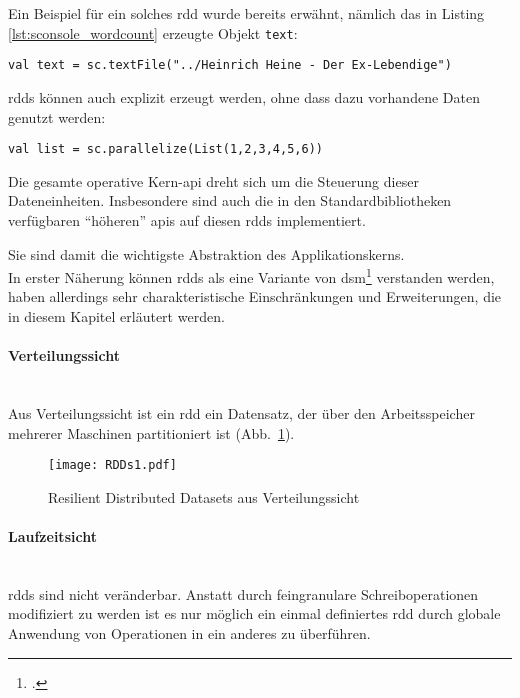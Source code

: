 Ein Beispiel für ein solches \gls{rdd} wurde bereits erwähnt, nämlich das in Listing \ref{lst:sconsole_wordcount} erzeugte Objekt \lstinline|text|:\\

\begin{lstlisting}
val text = sc.textFile("../Heinrich Heine - Der Ex-Lebendige")
\end{lstlisting}

\Glspl{rdd} können auch explizit erzeugt werden, ohne dass dazu vorhandene Daten genutzt werden:\\

\begin{lstlisting}
val list = sc.parallelize(List(1,2,3,4,5,6))
\end{lstlisting}

Die gesamte operative Kern-\gls{api} dreht sich um die Steuerung dieser Dateneinheiten. Insbesondere sind auch die in den Standardbibliotheken verfügbaren "`höheren"' \glspl{api} auf diesen \glspl{rdd} implementiert.

Sie sind damit die wichtigste Abstraktion des Applikationskerns.\\

In erster Näherung können \glspl{rdd} als eine Variante von \gls{dsm}\footcite{Nitzberg:1991:DSM:112827.112855} \cite{Mat12} verstanden werden, haben allerdings sehr charakteristische Einschränkungen und Erweiterungen, die in diesem Kapitel erläutert werden.\\

\paragraph{Verteilungssicht}\\

Aus Verteilungssicht ist ein \gls{rdd} ein Datensatz, der über den Arbeitsspeicher mehrerer Maschinen partitioniert ist (Abb.~\ref{fig:rdds1}).

\begin{figure}[ht!]
	\centering
  \texttt{[image: RDDs1.pdf]}
	\caption{Resilient Distributed Datasets aus Verteilungssicht}
	\label{fig:rdds1}
\end{figure}

\paragraph{Laufzeitsicht}\\

\Glspl{rdd} sind nicht veränderbar. Anstatt durch feingranulare Schreiboperationen modifiziert zu werden ist es nur möglich ein einmal definiertes \gls{rdd} durch globale Anwendung von Operationen in ein anderes zu überführen.\\

